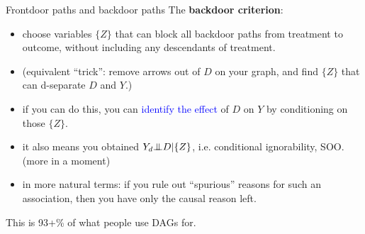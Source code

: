 \documentclass[xcolor=dvipsnames]{beamer}
\newcommand{\indep}{{\bot\negthickspace\negthickspace\bot}}
\begin{document}
\begin{frame}{Frontdoor paths and backdoor paths}
\small
{} The  \textbf{backdoor criterion}:\\
\begin{itemize} \setlength\itemsep{1em}
\item<2-> choose variables $\{Z\}$ that can block all backdoor paths from treatment to outcome, without including any descendants of treatment.
\item<3-> (equivalent ``trick'':  remove arrows out of $D$ on your graph, and find $\{Z\}$ that can d-separate $D$ and $Y$.)
\item<4-> if you can do this, you can \textcolor{Blue}{identify the effect} of $D$ on $Y$ by conditioning on those $\{Z\}$.
\item<5-> it also means you obtained $Y_d \indep D | \{Z\}$, i.e. conditional ignorability, SOO. (more in a moment)
\item<6-> in more natural terms: if you rule out ``spurious'' reasons for such an association, then you have only the causal reason left. 
\end{itemize}
 This is 93+\% of what people use DAGs for.\\
\end{frame}


%
\end{document}
